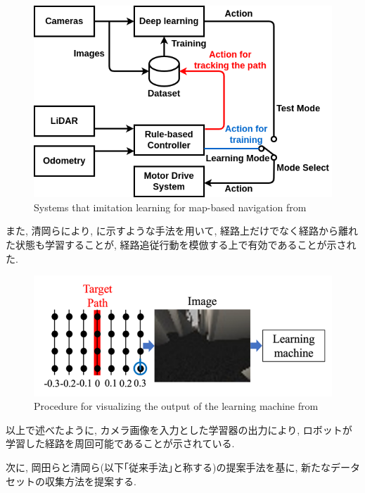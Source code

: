 \begin{figure}[h]
     \centering
     \includegraphics[keepaspectratio, scale=0.42]
     {images/okada-si2020.png}
     \caption{Systems that imitation learning for map-based navigation from \cite{okada-si2020}}
     \label{Fig:okada-si2020}
     \end{figure}

\newpage
また, 清岡ら\cite{kiyooka-si}により, に示すような手法を用いて, 経路上だけでなく経路から離れた状態も学習することが, 経路追従行動を模倣する上で有効であることが示された. 

\vspace{10mm}

\begin{figure}[h]
     \centering
     \includegraphics[keepaspectratio, scale=0.45]{images/kiyooka-si-1.png}
     \caption{Procedure for visualizing the output of the learning machine from \cite{kiyooka-si}}
     \label{Fig:kiyooka-si}
     \end{figure}

\vspace{20mm}
以上で述べたように, カメラ画像を入力とした学習器の出力により, ロボットが学習した経路を周回可能であることが示されている. \par 次に, 岡田らと清岡ら(以下｢従来手法｣と称する)の提案手法を基に, 新たなデータセットの収集方法を提案する.

